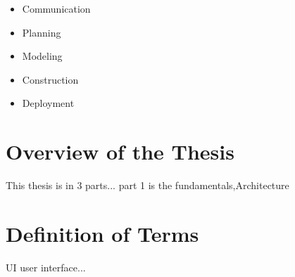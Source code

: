 \begin{itemize}
    \item Communication
    \item Planning
    \item Modeling
    \item Construction
    \item Deployment
\end{itemize}

\section{Overview of the Thesis}

This thesis is in 3 parts... part 1 is the fundamentals,Architecture 

\section{Definition of Terms}

UI user interface...